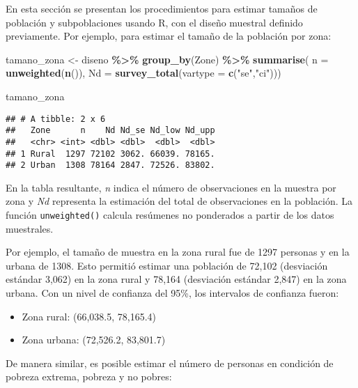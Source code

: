 \documentclass[
  12pt,
]{book}
\newenvironment{Shaded}{\begin{snugshade}}{\end{snugshade}}
\newcommand{\AttributeTok}[1]{\textcolor[rgb]{0.13,0.29,0.53}{#1}}
\newcommand{\FunctionTok}[1]{\textcolor[rgb]{0.13,0.29,0.53}{\textbf{#1}}}
\newcommand{\NormalTok}[1]{#1}
\newcommand{\OtherTok}[1]{\textcolor[rgb]{0.56,0.35,0.01}{#1}}
\newcommand{\SpecialCharTok}[1]{\textcolor[rgb]{0.81,0.36,0.00}{\textbf{#1}}}
\newcommand{\StringTok}[1]{\textcolor[rgb]{0.31,0.60,0.02}{#1}}
\providecommand{\tightlist}{%
  \setlength{\itemsep}{0pt}\setlength{\parskip}{0pt}}
\begin{document}
En esta sección se presentan los procedimientos para estimar tamaños de población y subpoblaciones usando R, con el diseño muestral definido previamente. Por ejemplo, para estimar el tamaño de la población por zona:

\begin{Shaded}
\begin{Highlighting}[]
\NormalTok{tamano\_zona }\OtherTok{\textless{}{-}}\NormalTok{ diseno }\SpecialCharTok{\%\textgreater{}\%} \FunctionTok{group\_by}\NormalTok{(Zone) }\SpecialCharTok{\%\textgreater{}\%} 
               \FunctionTok{summarise}\NormalTok{( }\AttributeTok{n =} \FunctionTok{unweighted}\NormalTok{(}\FunctionTok{n}\NormalTok{()), }
                          \AttributeTok{Nd =} \FunctionTok{survey\_total}\NormalTok{(}\AttributeTok{vartype =} \FunctionTok{c}\NormalTok{(}\StringTok{"se"}\NormalTok{,}\StringTok{"ci"}\NormalTok{)))}

\NormalTok{tamano\_zona}
\end{Highlighting}
\end{Shaded}

\begin{verbatim}
## # A tibble: 2 x 6
##   Zone      n    Nd Nd_se Nd_low Nd_upp
##   <chr> <int> <dbl> <dbl>  <dbl>  <dbl>
## 1 Rural  1297 72102 3062. 66039. 78165.
## 2 Urban  1308 78164 2847. 72526. 83802.
\end{verbatim}

En la tabla resultante, \emph{n} indica el número de observaciones en la muestra por zona y \emph{Nd} representa la estimación del total de observaciones en la población. La función \texttt{unweighted()} calcula resúmenes no ponderados a partir de los datos muestrales.

Por ejemplo, el tamaño de muestra en la zona rural fue de 1297 personas y en la urbana de 1308. Esto permitió estimar una población de 72,102 (desviación estándar 3,062) en la zona rural y 78,164 (desviación estándar 2,847) en la zona urbana. Con un nivel de confianza del 95\%, los intervalos de confianza fueron:

\begin{itemize}
\tightlist
\item
  Zona rural: (66,038.5, 78,165.4)
\item
  Zona urbana: (72,526.2, 83,801.7)
\end{itemize}

De manera similar, es posible estimar el número de personas en condición de pobreza extrema, pobreza y no pobres:
\end{document}
